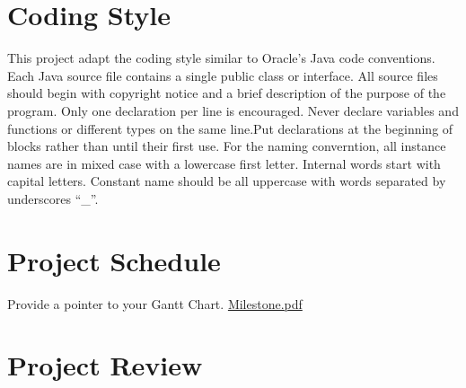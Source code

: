 \documentclass{article}
\begin{document}
\section{Coding Style}
This project adapt the coding style similar to Oracle's Java code conventions. Each Java source file contains a single public class or interface. All source files should begin with copyright notice and a brief description of the purpose of the program. Only one declaration per line is encouraged. Never declare variables and functions or different types on the same line.Put declarations at the beginning of blocks rather than until their first use. For the naming converntion, all instance names are in mixed case with a lowercase first letter. Internal words start with capital letters. Constant name should be all uppercase with words separated by underscores “\_”.
\section{Project Schedule}

Provide a pointer to your Gantt Chart.
\href{run:./Milestone.pdf}{Milestone.pdf}

\section{Project Review}
\end{document}
